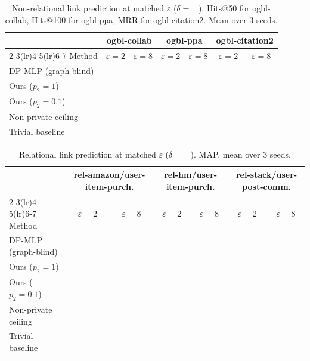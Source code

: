 \documentclass[11pt]{article}
\begin{document}
\begin{table}[H]
\centering\small
\caption{Non-relational link prediction at matched $\varepsilon$
($\delta = $ \ ). Hits@50 for ogbl-collab, Hits@100 for ogbl-ppa, MRR for
ogbl-citation2. Mean over 3 seeds.}
\label{tab:main-nonrel-lp}
\begin{tabular}{lcccccc}
\toprule
& \multicolumn{2}{c}{ogbl-collab} & \multicolumn{2}{c}{ogbl-ppa}
& \multicolumn{2}{c}{ogbl-citation2}\\
\cmidrule(lr){2-3}\cmidrule(lr){4-5}\cmidrule(lr){6-7}
Method & $\varepsilon{=}2$ & $\varepsilon{=}8$ & $\varepsilon{=}2$ & $\varepsilon{=}8$
       & $\varepsilon{=}2$ & $\varepsilon{=}8$\\
\midrule
DP-MLP (graph-blind) & & & & & & \\
Ours ($p_2{=}1$)     & & & & & & \\
Ours ($p_2{=}0.1$)   & & & & & & \\
\midrule
Non-private ceiling & \multicolumn{2}{c}{} & \multicolumn{2}{c}{} & \multicolumn{2}{c}{}\\
Trivial baseline    & \multicolumn{2}{c}{} & \multicolumn{2}{c}{} & \multicolumn{2}{c}{}\\
\bottomrule
\end{tabular}
\end{table}

\begin{table}[H]
\centering\small
\caption{Relational link prediction at matched $\varepsilon$
($\delta = $ \ ). MAP, mean over 3 seeds.}
\label{tab:main-rel-lp}
\begin{tabular}{lcccccc}
\toprule
& \multicolumn{2}{c}{rel-amazon/user-item-purch.} & \multicolumn{2}{c}{rel-hm/user-item-purch.}
& \multicolumn{2}{c}{rel-stack/user-post-comm.}\\
\cmidrule(lr){2-3}\cmidrule(lr){4-5}\cmidrule(lr){6-7}
Method & $\varepsilon{=}2$ & $\varepsilon{=}8$ & $\varepsilon{=}2$ & $\varepsilon{=}8$
       & $\varepsilon{=}2$ & $\varepsilon{=}8$\\
\midrule
DP-MLP (graph-blind) & & & & & & \\
Ours ($p_2{=}1$)     & & & & & & \\
Ours ($p_2{=}0.1$)   & & & & & & \\
\midrule
Non-private ceiling & \multicolumn{2}{c}{} & \multicolumn{2}{c}{} & \multicolumn{2}{c}{}\\
Trivial baseline    & \multicolumn{2}{c}{} & \multicolumn{2}{c}{} & \multicolumn{2}{c}{}\\
\bottomrule
\end{tabular}
\end{table}
\end{document}
